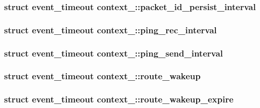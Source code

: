 \subsubsection[{packet\+\_\+id\+\_\+persist\+\_\+interval}]{\setlength{\rightskip}{0pt plus 5cm}struct {\bf event\+\_\+timeout} context\+\_\+::packet\+\_\+id\+\_\+persist\+\_\+interval}\label{structcontext__2_ab43cb5718dec488e16b44b0646d12a83}
\hypertarget{structcontext__2_af7d86fdde3cc1792be2bd85e735a2676}{}
\subsubsection[{ping\+\_\+rec\+\_\+interval}]{\setlength{\rightskip}{0pt plus 5cm}struct {\bf event\+\_\+timeout} context\+\_\+::ping\+\_\+rec\+\_\+interval}\label{structcontext__2_af7d86fdde3cc1792be2bd85e735a2676}
\hypertarget{structcontext__2_a32c2fe431b3437e963b149780188174f}{}
\subsubsection[{ping\+\_\+send\+\_\+interval}]{\setlength{\rightskip}{0pt plus 5cm}struct {\bf event\+\_\+timeout} context\+\_\+::ping\+\_\+send\+\_\+interval}\label{structcontext__2_a32c2fe431b3437e963b149780188174f}
\hypertarget{structcontext__2_ae8340ca648a8ecd965445186cf3a0ec1}{}
\subsubsection[{route\+\_\+wakeup}]{\setlength{\rightskip}{0pt plus 5cm}struct {\bf event\+\_\+timeout} context\+\_\+::route\+\_\+wakeup}\label{structcontext__2_ae8340ca648a8ecd965445186cf3a0ec1}
\hypertarget{structcontext__2_a328c64e187c662be87e6b8ea738a76cb}{}
\subsubsection[{route\+\_\+wakeup\+\_\+expire}]{\setlength{\rightskip}{0pt plus 5cm}struct {\bf event\+\_\+timeout} context\+\_\+::route\+\_\+wakeup\+\_\+expire}\label{structcontext__2_a328c64e187c662be87e6b8ea738a76cb}
\hypertarget{structcontext__2_a1aeeedd8cd4780c69f7626bcb81f4b90}{}
